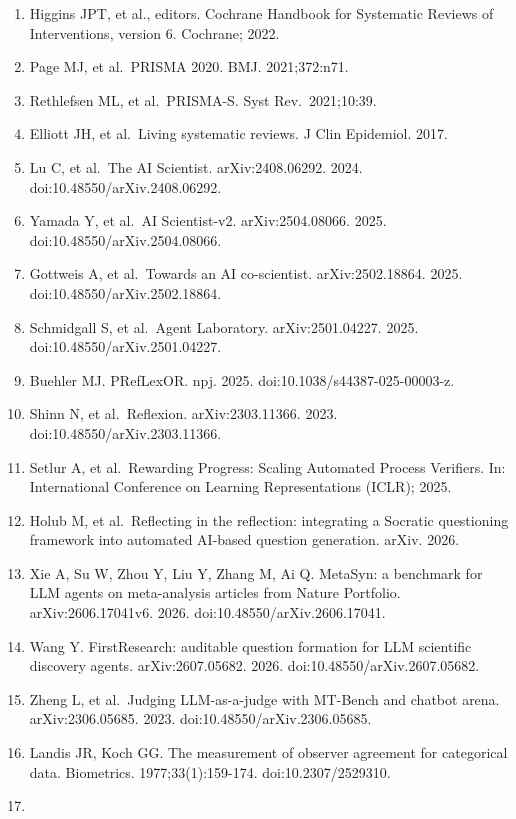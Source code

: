 \documentclass[
]{article}
\providecommand{\tightlist}{%
  \setlength{\itemsep}{0pt}\setlength{\parskip}{0pt}}
\begin{document}
\begin{enumerate}
\def\labelenumi{\arabic{enumi}.}
\tightlist
\item
  Higgins JPT, et al., editors. Cochrane Handbook for Systematic Reviews
  of Interventions, version 6. Cochrane; 2022.
\item
  Page MJ, et al.~PRISMA 2020. BMJ. 2021;372:n71.
\item
  Rethlefsen ML, et al.~PRISMA-S. Syst Rev.~2021;10:39.
\item
  Elliott JH, et al.~Living systematic reviews. J Clin Epidemiol. 2017.
\item
  Lu C, et al.~The AI Scientist. arXiv:2408.06292. 2024.
  doi:10.48550/arXiv.2408.06292.
\item
  Yamada Y, et al.~AI Scientist-v2. arXiv:2504.08066. 2025.
  doi:10.48550/arXiv.2504.08066.
\item
  Gottweis A, et al.~Towards an AI co-scientist. arXiv:2502.18864. 2025.
  doi:10.48550/arXiv.2502.18864.
\item
  Schmidgall S, et al.~Agent Laboratory. arXiv:2501.04227. 2025.
  doi:10.48550/arXiv.2501.04227.
\item
  Buehler MJ. PRefLexOR. npj. 2025. doi:10.1038/s44387-025-00003-z.
\item
  Shinn N, et al.~Reflexion. arXiv:2303.11366. 2023.
  doi:10.48550/arXiv.2303.11366.
\item
  Setlur A, et al.~Rewarding Progress: Scaling Automated Process
  Verifiers. In: International Conference on Learning Representations
  (ICLR); 2025.
\item
  Holub M, et al.~Reflecting in the reflection: integrating a Socratic
  questioning framework into automated AI-based question generation.
  arXiv. 2026.
\item
  Xie A, Su W, Zhou Y, Liu Y, Zhang M, Ai Q. MetaSyn: a benchmark for
  LLM agents on meta-analysis articles from Nature Portfolio.
  arXiv:2606.17041v6. 2026. doi:10.48550/arXiv.2606.17041.
\item
  Wang Y. FirstResearch: auditable question formation for LLM scientific
  discovery agents. arXiv:2607.05682. 2026.
  doi:10.48550/arXiv.2607.05682.
\item
  Zheng L, et al.~Judging LLM-as-a-judge with MT-Bench and chatbot
  arena. arXiv:2306.05685. 2023. doi:10.48550/arXiv.2306.05685.
\item
  Landis JR, Koch GG. The measurement of observer agreement for
  categorical data. Biometrics. 1977;33(1):159-174. doi:10.2307/2529310.
\item

\end{enumerate}
\end{document}
